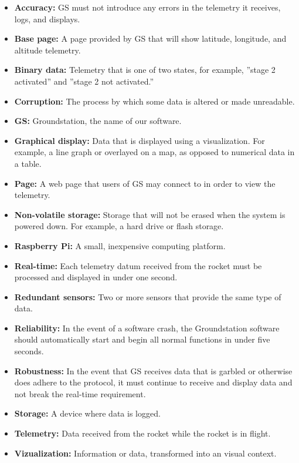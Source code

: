 \documentclass[10pt,journal,draftclsnofoot,onecolumn]{IEEEtran}
\begin{document}
	\begin{itemize}
		\item \textbf{Accuracy:} GS must not introduce any errors in the telemetry it receives, logs, and displays.
		\item \textbf{Base page:} A page provided by GS that will show latitude, longitude, and altitude telemetry.
		\item \textbf{Binary data:} Telemetry that is one of two states, for example, ''stage 2 activated'' and
		''stage 2 not activated.''
		\item \textbf{Corruption:} The process by which some data is altered or made unreadable.
		\item \textbf{GS:} Groundstation, the name of our software.
		\item \textbf{Graphical display:} Data that is displayed using a visualization. For example, a line graph or overlayed
		on a map, as opposed to numerical data in a table.
		\item \textbf{Page:} A web page that users of GS may connect to in order to view the telemetry.
		\item \textbf{Non-volatile storage:} Storage that will not be erased when the system is powered down.
		For example, a hard drive or flash storage.
		\item \textbf{Raspberry Pi:} A small, inexpensive computing platform.		
		\item \textbf{Real-time:} Each telemetry datum received from the rocket must be processed and
		displayed in under one second.
		\item \textbf{Redundant sensors:} Two or more sensors that provide the same type of data.
		\item \textbf{Reliability:} In the event of a software crash, the Groundstation software should automatically
		start and begin all normal functions in under five seconds.
		\item \textbf{Robustness:} In the event that GS receives data that is garbled or otherwise does adhere
		to the protocol, it must continue to receive and display data and not break the real-time requirement.
		\item \textbf{Storage:} A device where data is logged.		
		\item \textbf{Telemetry:} Data received from the rocket while the rocket is in flight.		
		\item \textbf{Vizualization:} Information or data, transformed into an visual context.
	\end{itemize}	
	
\end{document}
